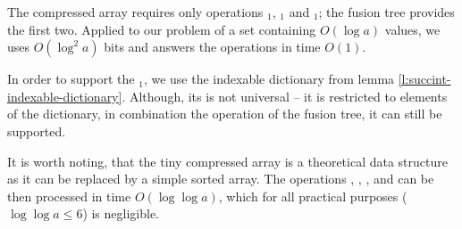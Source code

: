 The compressed array requires only operations \prev$_1$, \succ$_1$ and \rank$_1$; the fusion tree provides the first two.
Applied to our problem of a set containing $O(\log a)$ values, we uses $O(\log^2 a)$ bits and answers the operations in time $O(1)$.

In order to support the \rank$_1$, we use the indexable dictionary from lemma \ref{l:succint-indexable-dictionary}.
Although, its \rank{} is not universal -- it is restricted to elements of the dictionary, in combination the \pred{} operation of the fusion tree, it can still be supported.

\bigbreak

It is worth noting, that the tiny compressed array is a theoretical data structure as it can be replaced by a simple sorted array.
The operations \rank{}, \select{}, \pred{}, and \succ{} can be then processed in time $O(\log \log a)$, which for all practical purposes ($\log \log a \le 6$) is negligible.